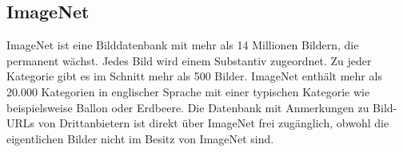 %
%


\subsection{ImageNet}

ImageNet ist eine Bilddatenbank mit mehr als 14 Millionen Bildern, die permanent wächst. Jedes Bild wird einem Substantiv zugeordnet. Zu jeder Kategorie gibt es im Schnitt mehr als 500 Bilder. ImageNet enthält mehr als 20.000 Kategorien in englischer Sprache mit einer typischen Kategorie wie beispielsweise \glqq Ballon\grqq{} oder \glqq Erdbeere\grqq. Die Datenbank mit Anmerkungen zu Bild-URLs von Drittanbietern ist direkt über ImageNet frei zugänglich, obwohl die eigentlichen Bilder nicht im Besitz von ImageNet sind. \cite{Deng:2009,Shankar:2020,Krizhevsky:2012b}